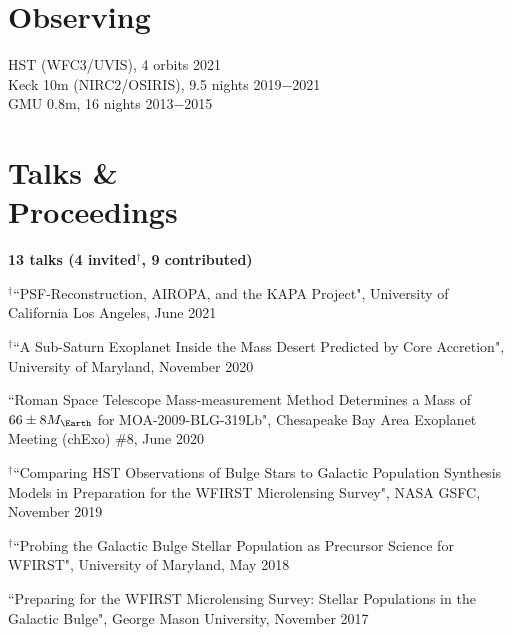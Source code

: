 \documentclass[margin,line]{res}
\begin{document}
\begin{resume}
\section{\sc Observing}
HST (WFC3/UVIS), 4 orbits \hfill 2021\\
Keck 10m (NIRC2/OSIRIS), 9.5 nights \hfill 2019$-$2021\\
GMU 0.8m, 16 nights \hfill 2013$-$2015 \\

\section{\sc Talks \&\\ Proceedings}
\textbf{13 talks (4 invited$^{\dagger}$, 9 contributed)}\\
\begin{etaremune}
\item $^{\dagger}$``PSF-Reconstruction, AIROPA, and the KAPA Project", University of California Los Angeles, June 2021

\item $^{\dagger}$``A Sub-Saturn Exoplanet Inside the Mass Desert Predicted by Core Accretion", University of Maryland, November 2020

\item ``Roman Space Telescope Mass-measurement Method Determines a Mass of $66 \pm 8M_{\Earth}$ for MOA-2009-BLG-319Lb", Chesapeake Bay Area Exoplanet Meeting (chExo) \#8, June 2020

\item $^{\dagger}$``Comparing HST Observations of Bulge Stars to Galactic Population Synthesis Models in Preparation for the WFIRST Microlensing Survey", NASA GSFC, November 2019 
\item $^{\dagger}$``Probing the Galactic Bulge Stellar Population as Precursor Science for WFIRST", University of Maryland, May 2018

\item ``Preparing for the WFIRST Microlensing Survey: Stellar Populations in the Galactic Bulge", George Mason University, November 2017


\end{etaremune}
\end{resume}
\end{document}
